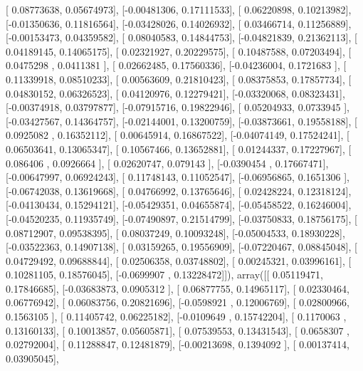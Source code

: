 \documentclass{article}
\begin{document}
       [ 0.08773638,  0.05674973],
       [-0.00481306,  0.17111533],
       [ 0.06220898,  0.10213982],
       [-0.01350636,  0.11816564],
       [-0.03428026,  0.14026932],
       [ 0.03466714,  0.11256889],
       [-0.00153473,  0.04359582],
       [ 0.08040583,  0.14844753],
       [-0.04821839,  0.21362113],
       [ 0.04189145,  0.14065175],
       [ 0.02321927,  0.20229575],
       [ 0.10487588,  0.07203494],
       [ 0.0475298 ,  0.0411381 ],
       [ 0.02662485,  0.17560336],
       [-0.04236004,  0.1721683 ],
       [ 0.11339918,  0.08510233],
       [ 0.00563609,  0.21810423],
       [ 0.08375853,  0.17857734],
       [ 0.04830152,  0.06326523],
       [ 0.04120976,  0.12279421],
       [-0.03320068,  0.08323431],
       [-0.00374918,  0.03797877],
       [-0.07915716,  0.19822946],
       [ 0.05204933,  0.0733945 ],
       [-0.03427567,  0.14364757],
       [-0.02144001,  0.13200759],
       [-0.03873661,  0.19558188],
       [ 0.0925082 ,  0.16352112],
       [ 0.00645914,  0.16867522],
       [-0.04074149,  0.17524241],
       [ 0.06503641,  0.13065347],
       [ 0.10567466,  0.13652881],
       [ 0.01244337,  0.17227967],
       [ 0.086406  ,  0.0926664 ],
       [ 0.02620747,  0.079143  ],
       [-0.0390454 ,  0.17667471],
       [-0.00647997,  0.06924243],
       [ 0.11748143,  0.11052547],
       [-0.06956865,  0.1651306 ],
       [-0.06742038,  0.13619668],
       [ 0.04766992,  0.13765646],
       [ 0.02428224,  0.12318124],
       [-0.04130434,  0.15294121],
       [-0.05429351,  0.04655874],
       [-0.05458522,  0.16246004],
       [-0.04520235,  0.11935749],
       [-0.07490897,  0.21514799],
       [-0.03750833,  0.18756175],
       [ 0.08712907,  0.09538395],
       [ 0.08037249,  0.10093248],
       [-0.05004533,  0.18930228],
       [-0.03522363,  0.14907138],
       [ 0.03159265,  0.19556909],
       [-0.07220467,  0.08845048],
       [ 0.04729492,  0.09688844],
       [ 0.02506358,  0.03748802],
       [ 0.00245321,  0.03996161],
       [ 0.10281105,  0.18576045],
       [-0.0699907 ,  0.13228472]]), array([[ 0.05119471,  0.17846685],
       [-0.03683873,  0.0905312 ],
       [ 0.06877755,  0.14965117],
       [ 0.02330464,  0.06776942],
       [ 0.06083756,  0.20821696],
       [-0.0598921 ,  0.12006769],
       [ 0.02800966,  0.1563105 ],
       [ 0.11405742,  0.06225182],
       [-0.0109649 ,  0.15742204],
       [ 0.1170063 ,  0.13160133],
       [ 0.10013857,  0.05605871],
       [ 0.07539553,  0.13431543],
       [ 0.0658307 ,  0.02792004],
       [ 0.11288847,  0.12481879],
       [-0.00213698,  0.1394092 ],
       [ 0.00137414,  0.03905045],
\end{document}

